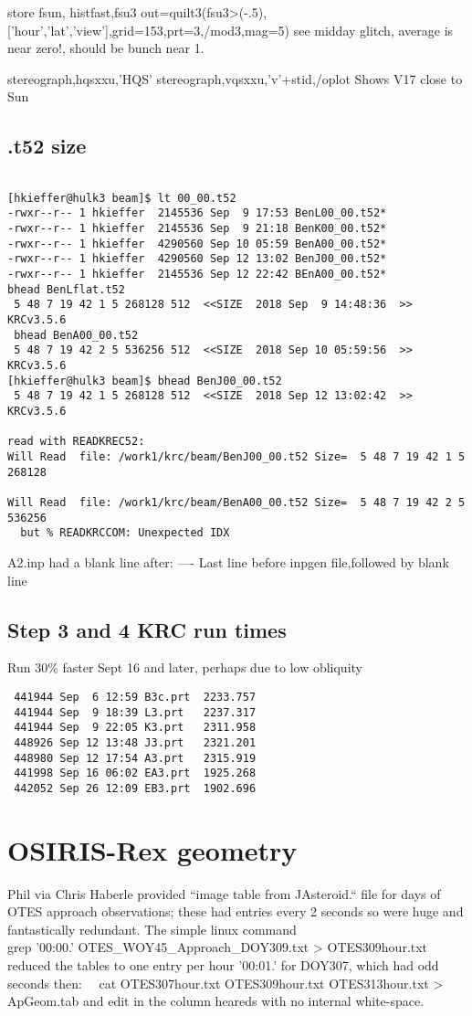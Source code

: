 \documentclass{article}
\begin{document}
store fsun,
 histfast,fsu3
 out=quilt3(fsu3>(-.5),['hour','lat','view'],grid=153,prt=3,/mod3,mag=5)
 see midday glitch, average is near zero!, should be bunch near 1.

stereograph,hqsxxu,'HQS'  
stereograph,vqsxxu,'v'+stid,/oplot  Shows V17 close to Sun
\subsection{.t52 size}

\begin{verbatim}

[hkieffer@hulk3 beam]$ lt 00_00.t52
-rwxr--r-- 1 hkieffer  2145536 Sep  9 17:53 BenL00_00.t52*
-rwxr--r-- 1 hkieffer  2145536 Sep  9 21:18 BenK00_00.t52*
-rwxr--r-- 1 hkieffer  4290560 Sep 10 05:59 BenA00_00.t52*
-rwxr--r-- 1 hkieffer  4290560 Sep 12 13:02 BenJ00_00.t52*
-rwxr--r-- 1 hkieffer  2145536 Sep 12 22:42 BEnA00_00.t52*
bhead BenLflat.t52
 5 48 7 19 42 1 5 268128 512  <<SIZE  2018 Sep  9 14:48:36  >>  KRCv3.5.6
 bhead BenA00_00.t52
 5 48 7 19 42 2 5 536256 512  <<SIZE  2018 Sep 10 05:59:56  >>  KRCv3.5.6
[hkieffer@hulk3 beam]$ bhead BenJ00_00.t52
 5 48 7 19 42 1 5 268128 512  <<SIZE  2018 Sep 12 13:02:42  >>  KRCv3.5.6

read with READKREC52:
Will Read  file: /work1/krc/beam/BenJ00_00.t52 Size=  5 48 7 19 42 1 5 268128

Will Read  file: /work1/krc/beam/BenA00_00.t52 Size=  5 48 7 19 42 2 5 536256
  but % READKRCCOM: Unexpected IDX
\end{verbatim}  
 A2.inp had a blank line after: ---- Last line before inpgen file,followed by blank line

\subsection{Step 3 and 4 KRC run times}
Run 30\% faster Sept 16 and later, perhaps due to low obliquity
\begin{verbatim}
 441944 Sep  6 12:59 B3c.prt  2233.757
 441944 Sep  9 18:39 L3.prt   2237.317 
 441944 Sep  9 22:05 K3.prt   2311.958
 448926 Sep 12 13:48 J3.prt   2321.201
 448980 Sep 12 17:54 A3.prt   2315.919
 441998 Sep 16 06:02 EA3.prt  1925.268
 442052 Sep 26 12:09 EB3.prt  1902.696
\end{verbatim}  

\section{OSIRIS-Rex geometry}
Phil via Chris Haberle provided  ``image table from JAsteroid.`` file for 
 days of OTES approach observations; these had entries every 2 seconds so were huge and fantastically redundant. The simple linux command  
\\  grep '00:00.' OTES_WOY45_Approach_DOY309.txt > OTES309hour.txt reduced the tables to one entry per hour
\qi  '00:01.' for DOY307, which had odd seconds
\qi then: \ \  cat OTES307hour.txt  OTES309hour.txt OTES313hour.txt > ApGeom.tab
\qii and edit in the column heareds with no internal white-space.
\end{document}

